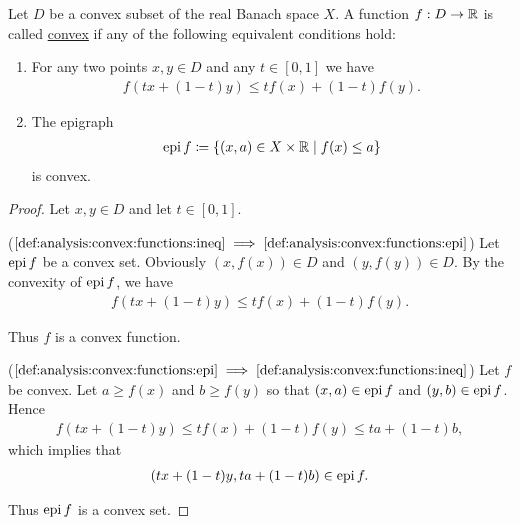 \begin{definition}\label{def:analysis:convex:functions}
  Let $D$ be a convex subset of the real Banach space $X$. A function $f: D \to \mathbb{R}$ is called \uline{convex} if any of the following equivalent conditions hold:

  \begin{enumerate}
    \item\label{def:analysis:convex:functions:ineq} For any two points $x, y \in D$ and any $t \in [0, 1]$ we have
    \begin{align*}
      f(tx + (1-t)y) \leq tf(x) + (1-t)f(y).
    \end{align*}

    \item\label{def:analysis:convex:functions:epi} The epigraph %
    \begin{align*}
      \operatorname{epi} f \coloneqq \{ (x, a) \in X \times \mathbb{R} \mid f(x) \leq a \}
    \end{align*}
    is convex.
  \end{enumerate}
\end{definition}
\begin{proof}
  Let $x, y \in D$ and let $t \in [0, 1]$.

  ($\ref{def:analysis:convex:functions:ineq} \implies \ref{def:analysis:convex:functions:epi}$) Let $\operatorname{epi} f$ be a convex set. Obviously $(x, f(x)) \in D$ and $(y, f(y)) \in D$. By the convexity of $\operatorname{epi} f$, we have
  \begin{align*}
    f(tx + (1-t)y) \leq tf(x) + (1-t)f(y).
  \end{align*}

  Thus $f$ is a convex function.

  ($\ref{def:analysis:convex:functions:epi} \implies \ref{def:analysis:convex:functions:ineq}$) Let $f$ be convex. Let $a \geq f(x)$ and $b \geq f(y)$ so that $(x, a) \in \operatorname{epi} f$ and $(y, b) \in \operatorname{epi} f$. Hence
  \begin{align*}
    f(tx + (1-t)y) \leq tf(x) + (1-t)f(y) \leq ta + (1-t)b,
  \end{align*}
  which implies that
  \begin{align*}
    (tx + (1-t)y, ta + (1-t)b) \in \operatorname{epi} f.
  \end{align*}

  Thus $\operatorname{epi} f$ is a convex set.
\end{proof}
